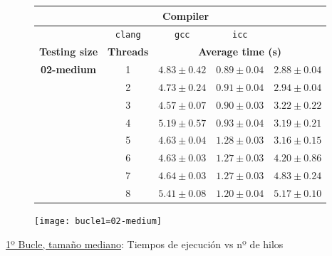 \begin{figure}[H]
    \centering
    \begin{subfigure}{0.4\textwidth}
        \begin{adjustbox}{width=\textwidth} 
        \begin{tabular}{|c|c|c|c|c|}
            \hline
            \rowcolor{azul} \multicolumn{2}{|c|}{}&\multicolumn{3}{c|}{\textbf{Compiler}} \\ \hline
            \rowcolor{azul} \multicolumn{2}{|c|}{}&\texttt{clang}&\texttt{gcc}&\texttt{icc}\\ \hline
            \rowcolor{azul} \textbf{Testing size} & \textbf{Threads}&\multicolumn{3}{c|}{\textbf{Average time (s)}} \\ \hline
            \multirow{8}{2.5cm}{\textbf{02-medium}} & 1 & \(4.83\pm{0.42}\) & \(0.89\pm{0.04}\) & \(2.88\pm{0.04}\) \\ \cline{2-5}
            & 2 & \(4.73\pm{0.24}\) & \(0.91\pm{0.04}\) & \(2.94\pm{0.04}\) \\ \cline{2-5}
            & 3 & \(4.57\pm{0.07}\) & \(0.90\pm{0.03}\) & \(3.22\pm{0.22}\) \\ \cline{2-5}
            & 4 & \(5.19\pm{0.57}\) & \(0.93\pm{0.04}\) & \(3.19\pm{0.21}\) \\ \cline{2-5}
            & 5 & \(4.63\pm{0.04}\) & \(1.28\pm{0.03}\) & \(3.16\pm{0.15}\) \\ \cline{2-5}
            & 6 & \(4.63\pm{0.03}\) & \(1.27\pm{0.03}\) & \(4.20\pm{0.86}\) \\ \cline{2-5}
            & 7 & \(4.64\pm{0.03}\) & \(1.27\pm{0.03}\) & \(4.83\pm{0.24}\) \\ \cline{2-5}
            & 8 & \(5.41\pm{0.08}\) & \(1.20\pm{0.04}\) & \(5.17\pm{0.10}\) \\ \hline
        \end{tabular}
        \end{adjustbox}
    \end{subfigure}
    \hfill
    \begin{subfigure}{0.5\textwidth}
        \texttt{[image: bucle1=02-medium]}
    \end{subfigure}
    \caption{\underline{1º Bucle, tamaño mediano}: Tiempos de ejecución vs nº de hilos}
    \label{bucle1=02-medium}
\end{figure}

